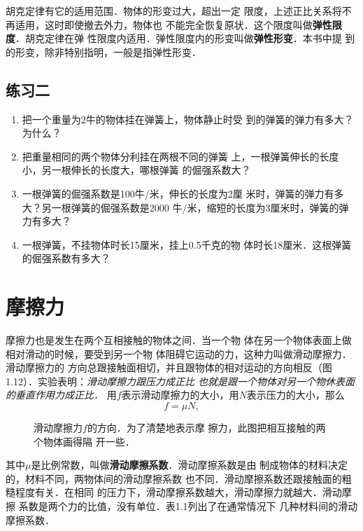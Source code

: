     胡克定律有它的适用范围．物体的形变过大，超出一定
限度，上述正比关系将不再适用，这时即使撤去外力，物体也
不能完全恢复原状．这个限度叫做\textbf{弹性限度}．胡克定律在弹
性限度内适用．弹性限度内的形变叫做\textbf{弹性形变}．本书中提
到的形变，除非特别指明，一般是指弹性形变．

\subsection*{练习二}
\begin{enumerate}
\item 把一个重量为2牛的物体挂在弹簧上，物体静止时受
到的弹簧的弹力有多大？为什么？
\item 把重量相同的两个物体分利挂在两根不同的弹簧
上，一根弹簧伸长的长度小，另一根伸长的长度大，哪根弹簧
的倔强系数大？
\item 一根弹簧的倔强系数是100牛/米，伸长的长度为2厘
米时，弹簧的弹力有多大？另一根弹簧的倔强系数是2000
牛/米，缩短的长度为3厘米时，弹簧的弹力有多大？
\item 一根弹簧，不挂物体时长15厘米，挂上0.5千克的物
体时长18厘米．这根弹簧的倔强系数有多大？
\end{enumerate}

\section{摩擦力}
    摩擦力也是发生在两个互相接触的物体之间．当一个物
体在另一个物体表面上做相对滑动的时候，要受到另一个物
体阻碍它运动的力，这种力叫做滑动摩擦力．滑动摩擦力的
方向总跟接触面相切，并且跟物体的相对运动的方向相反（图
1.12）．实验表明：\textit{滑动摩擦力跟压力成正比
也就是跟一个物体对另一个物休表面的垂直作用力成正比．}
用$f$表示滑动摩擦力的大小，用$N$表示压力的大小，那么
\[f=\mu N,\]
\begin{figure}[htp]\centering
{}
\caption{滑动摩擦力$f$的方向．为了清楚地表示摩
擦力，此图把相互接触的两个物体画得隔
开一些．
}
\end{figure}
其中$\mu$是比例常数，叫做\textbf{滑动摩擦系数}．滑动摩擦系数是由
制成物体的材料决定的，材料不同，两物体间的滑动摩擦系数
也不同．滑动摩擦系数还跟接触面的粗糙程度有关．在相同
的压力下，滑动摩擦系数越大，滑动摩擦力就越大．滑动摩擦
系数是两个力的比值，没有单位．表1.1列出了在通常情况下
几种材料间的滑动摩擦系数．


